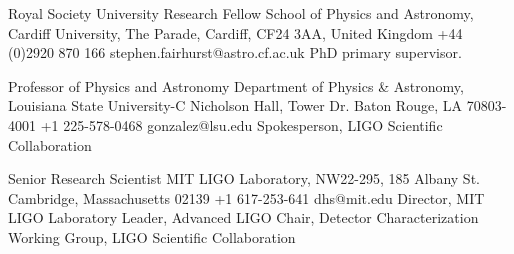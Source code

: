 
            {Royal Society University Research Fellow}
            {School of Physics and Astronomy, Cardiff University, The Parade, Cardiff,\newline
            CF24 3AA, United Kingdom}
            {+44 (0)2920 870 166}
            {stephen.fairhurst@astro.cf.ac.uk}
            {PhD primary supervisor.}



            {Professor of Physics and Astronomy}
            {Department of Physics \& Astronomy, %
                 Louisiana State University-C Nicholson Hall, Tower Dr.\newline
             Baton Rouge, LA 70803-4001}
            {+1 225-578-0468}
            {gonzalez@lsu.edu}
            {Spokesperson, LIGO Scientific Collaboration}

            {Senior Research Scientist}
            {MIT LIGO Laboratory, NW22-295, 185 Albany St.\newline
             Cambridge, Massachusetts 02139}
            {+1 617-253-641}
            {dhs@mit.edu}
            {Director, MIT LIGO Laboratory\newline%
             Leader, Advanced LIGO\newline%
             Chair, Detector Characterization Working Group, LIGO Scientific Collaboration}
